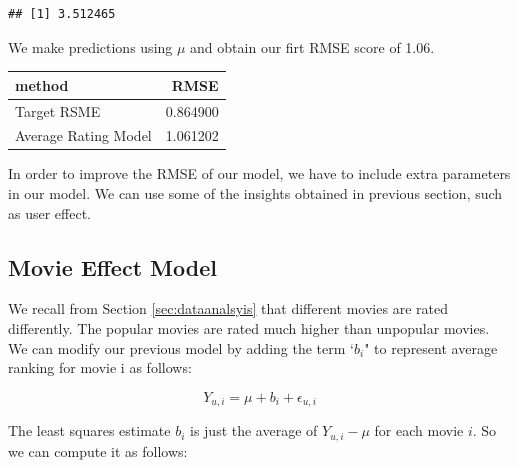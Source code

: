 \documentclass[]{article}
\newenvironment{Shaded}{\begin{snugshade}}{\end{snugshade}}
\newcommand{\CommentTok}[1]{\textcolor[rgb]{0.56,0.35,0.01}{\textit{#1}}}
\newcommand{\DataTypeTok}[1]{\textcolor[rgb]{0.13,0.29,0.53}{#1}}
\newcommand{\KeywordTok}[1]{\textcolor[rgb]{0.13,0.29,0.53}{\textbf{#1}}}
\newcommand{\NormalTok}[1]{#1}
\newcommand{\OperatorTok}[1]{\textcolor[rgb]{0.81,0.36,0.00}{\textbf{#1}}}
\newcommand{\StringTok}[1]{\textcolor[rgb]{0.31,0.60,0.02}{#1}}
\begin{document}
\begin{verbatim}
## [1] 3.512465
\end{verbatim}

We make predictions using \(\mu\) and obtain our firt RMSE score of
1.06.

\begin{Shaded}
\end{Shaded}

\begin{longtable}[]{@{}lr@{}}
\toprule
method & RMSE\tabularnewline
\midrule
\endhead
Target RSME & 0.864900\tabularnewline
Average Rating Model & 1.061202\tabularnewline
\bottomrule
\end{longtable}

In order to improve the RMSE of our model, we have to include extra
parameters in our model. We can use some of the insights obtained in
previous section, such as user effect.

\subsection{Movie Effect Model}
\label{sec:mem}

We recall from Section \ref{sec:dataanalsyis} that different movies are
rated differently. The popular movies are rated much higher than
unpopular movies. We can modify our previous model by adding the term
`\(b_{i}\)" to represent average ranking for movie i as follows:

\begin{equation}
Y_{u, i} = \mu +b_{i}+ \epsilon_{u, i}
\end{equation}

The least squares estimate \(b_{i}\) is just the average of
\(Y_{u,i} - \mu\) for each movie \(i\). So we can compute it as follows:

\begin{Shaded}
\end{Shaded}
\end{document}
